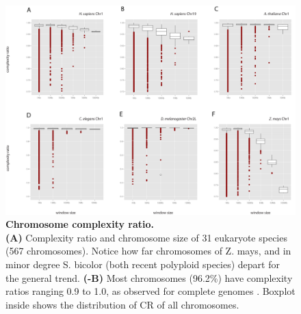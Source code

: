 \begin{figure}[htpb] 
\centering 
\includegraphics[width=\textwidth]{tex_source/figures/dna_struct/box_complexity_windows.png}
\caption[Chromosome complexity ratio]{{\bf Chromosome complexity ratio.} \\\textbf{(A)} Complexity ratio and chromosome size of 31 eukaryote species (567 chromosomes). Notice how far chromosomes of Z. mays, and in minor degree S. bicolor (both recent polyploid species) depart for the general trend. \textbf{(-B)} Most chromosomes (96.2\%) have complexity ratios ranging 0.9 to 1.0, as observed for complete genomes . Boxplot inside shows the distribution of CR of all
chromosomes.}
\label{fig:box_compl}
\end{figure}


